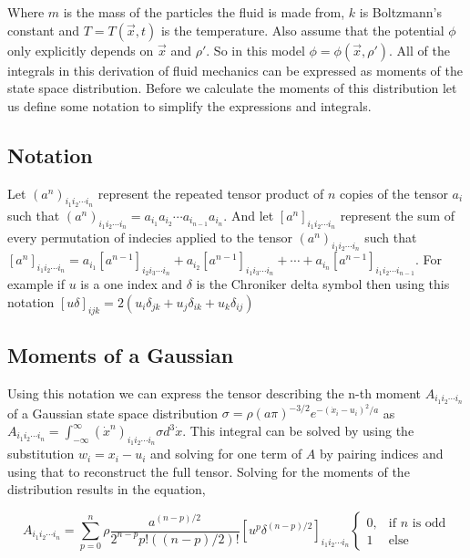 \documentclass[%
 twocolumn,
 amsmath,amssymb,
 aps,
]{revtex4-1}
\newcommand{\intVdot}[1]{\int_{-\infty}^{\infty} #1 d^3\dot{x}}
\begin{document}
Where $m$ is the mass of the particles the fluid is made from, $k$ is Boltzmann's constant and $T=T(\vec{x}, t)$ is the temperature. Also assume that the potential $\phi$ only explicitly depends on $\vec{x}$ and $\rho'$. So in this model $\phi=\phi(\vec{x}, \rho')$. All of the integrals in this derivation of fluid mechanics can be expressed as moments of the state space distribution. Before we calculate the moments of this distribution let us define some notation to simplify the expressions and integrals.

\subsection{Notation}
Let $\left(a^n\right)_{i_1i_2\cdots i_n}$ represent the repeated tensor product of $n$ copies of the tensor $a_i$ such that $\left(a^n\right)_{i_1i_2\cdots i_n}=a_{i_1}a_{i_2}\cdots a_{i_{n-1}}a_{i_n}$. And let $\left[a^n\right]_{i_1i_2\cdots i_n}$ represent the sum of every permutation of indecies applied to the tensor $\left(a^n\right)_{i_1i_2\cdots i_n}$ such that $\left[a^n\right]_{i_1i_2\cdots i_n}=a_{i_1}\left[a^{n-1}\right]_{i_2i_3\cdots i_n} + a_{i_2}\left[a^{n-1}\right]_{i_1i_3\cdots i_n} + \cdots + a_{i_n}\left[a^{n-1}\right]_{i_1i_2\cdots i_{n-1}}$. For example if $u$ is a one index and $\delta$ is the Chroniker delta symbol then using this notation $\left[u\delta\right]_{ijk}=2\left(u_i\delta_{jk} + u_j\delta_{ik} + u_k\delta_{ij}\right)$

\subsection{Moments of a Gaussian}
Using this notation we can express the tensor describing the n-th moment $A_{i_1i_2\cdots i_n}$ of a Gaussian state space distribution $\sigma=\rho\left(a \pi\right)^{-3/2}e^{-\left(\dot{x}_i-u_i\right)^2/a}$ as $A_{i_1i_2\cdots i_n}=\intVdot{\left(\dot{x}^n\right)_{i_1i_2\cdots i_n}\sigma}$. This integral can be solved by using the substitution $w_i=x_i - u_i$ and solving for one term of $A$ by pairing indices and using that to reconstruct the full tensor. Solving for the moments of the distribution results in the equation,

\begin{equation}
A_{i_1i_2\cdots i_n}=\sum_{p=0}^n\rho\frac{a^{\left(n-p\right)/2}}{2^{n-p}p!\left(\left(n-p\right)/2\right)!}\left[u^p\delta^{\left(n-p\right)/2}\right]_{i_1i_2\cdots i_n}
\begin{cases}
0, & \text{if $n$ is odd}\\
1 &  \text{else}
\end{cases}
\label{gaussian_moments}
\end{equation}
\end{document}
